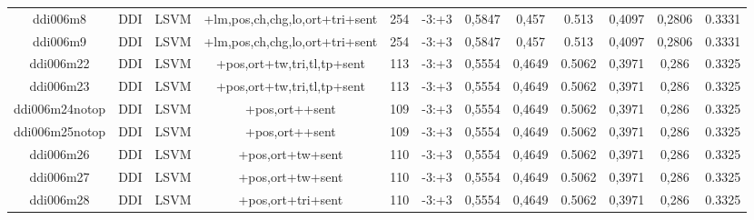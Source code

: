\documentclass[a4paper]{article}
\begin{document}
\begin{landscape}
\begin{center}
\begin{tabular}{ |c|c|c|c|c|c|c|c|c|c|c|c|}
 	
 
 	
 		
 		\small{ ddi006m8 } & DDI & LSVM & +lm,pos,ch,chg,lo,ort+tri+sent  &  254 &  -3:+3  &  0,5847 & 0,457 & 0.513  &  0,4097 & 0,2806 & 0.3331 \\
 		

 	
 
 	
 		
 		\small{ ddi006m9 } & DDI & LSVM & +lm,pos,ch,chg,lo,ort+tri+sent  &  254 &  -3:+3  &  0,5847 & 0,457 & 0.513  &  0,4097 & 0,2806 & 0.3331 \\
 		

 	
 
 	
 		
 		\small{ ddi006m22 } & DDI & LSVM & +pos,ort+tw,tri,tl,tp+sent  &  113 &  -3:+3  &  0,5554 & 0,4649 & 0.5062  &  0,3971 & 0,286 & 0.3325 \\
 		

 	
 
 	
 		
 		\small{ ddi006m23 } & DDI & LSVM & +pos,ort+tw,tri,tl,tp+sent  &  113 &  -3:+3  &  0,5554 & 0,4649 & 0.5062  &  0,3971 & 0,286 & 0.3325 \\
 		

 	
 
 	
 		
 		\small{ ddi006m24notop } & DDI & LSVM & +pos,ort++sent  &  109 &  -3:+3  &  0,5554 & 0,4649 & 0.5062  &  0,3971 & 0,286 & 0.3325 \\
 		

 	
 
 	
 		
 		\small{ ddi006m25notop } & DDI & LSVM & +pos,ort++sent  &  109 &  -3:+3  &  0,5554 & 0,4649 & 0.5062  &  0,3971 & 0,286 & 0.3325 \\
 		

 	
 
 	
 		
 		\small{ ddi006m26 } & DDI & LSVM & +pos,ort+tw+sent  &  110 &  -3:+3  &  0,5554 & 0,4649 & 0.5062  &  0,3971 & 0,286 & 0.3325 \\
 		

 	
 
 	
 		
 		\small{ ddi006m27 } & DDI & LSVM & +pos,ort+tw+sent  &  110 &  -3:+3  &  0,5554 & 0,4649 & 0.5062  &  0,3971 & 0,286 & 0.3325 \\
 		

 	
 
 	
 		
 		\small{ ddi006m28 } & DDI & LSVM & +pos,ort+tri+sent  &  110 &  -3:+3  &  0,5554 & 0,4649 & 0.5062  &  0,3971 & 0,286 & 0.3325 \\
 		


\end{tabular}
\end{center}
\end{landscape}
\end{document}
